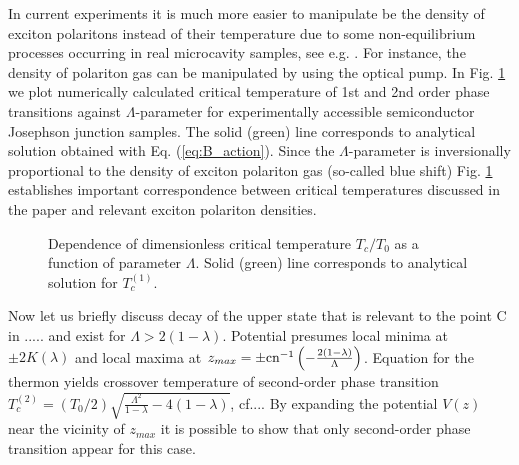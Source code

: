 \documentclass[aps, pre, preprint, groupedaddress, superscriptaddress, showkeys, showpacs] {revtex4-1}
\begin{document}
In current experiments it is much more easier to manipulate be the density of exciton polaritons instead of their temperature due to some  non-equilibrium processes occurring in real microcavity samples, see e.g. \cite{Sanvitto,Guillet}.
For instance, the density of polariton gas can be manipulated by using the optical pump.
In Fig. \ref{pic:temperatures} we plot numerically calculated critical temperature of 1st and 2nd order phase transitions against $\Lambda$-parameter for experimentally accessible semiconductor Josephson junction samples.
The solid (green) line corresponds to analytical solution obtained with  Eq. (\ref{eq:B_action}).
Since the $\Lambda$-parameter is inversionally proportional to the density of exciton polariton gas (so-called blue shift) Fig. \ref{pic:temperatures} establishes important correspondence between critical temperatures discussed in the paper and relevant exciton polariton densities.
%
\begin{figure}[ht]
\caption
{Dependence of dimensionless critical temperature $T_{c}/T_{0}$ as a function of parameter $\Lambda$. Solid (green) line corresponds to analytical solution for  $T_{c}^{(1)}$.     
\label{pic:temperatures}}
\end{figure}
%

Now let us briefly discuss decay of the upper state that is relevant to the point C in ..... and exist for $\Lambda > 2(1 - \lambda)$.
Potential presumes local minima at $\pm 2K(\lambda)$ and local maxima at $z_{max} = \pm \textrm{cn}^{-1} \left( -\frac{2(1 - \lambda)}{\Lambda} \right)$.
Equation for the thermon yields 
crossover temperature of second-order phase transition $T_{c}^{(2)} = (T_{0}/ 2) \sqrt{\frac{\Lambda^2}{1 - \lambda} - 4(1 - \lambda)}$, cf.... 
%
%
By expanding the potential $V(z)$ near the vicinity of $z_{max}$ it is possible to show that only second-order phase transition appear for this case.
\end{document}
